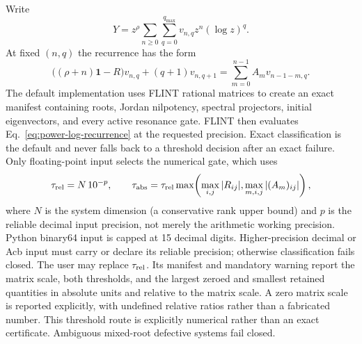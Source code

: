 \documentclass[11pt]{article}
\newcommand{\Id}{\mathbf 1}
\begin{document}
Write
\begin{equation}
  Y=z^\rho\sum_{n\geq0}\sum_{q=0}^{q_{\max}}
  v_{n,q}z^n(\log z)^q.
\end{equation}
At fixed $(n,q)$ the recurrence has the form
\begin{equation}
  \bigl((\rho+n)\Id-R\bigr)v_{n,q}
  +(q+1)v_{n,q+1}
  =\sum_{m=0}^{n-1}A_m v_{n-1-m,q}.
  \label{eq:power-log-recurrence}
\end{equation}
The default implementation uses FLINT rational matrices to create an exact manifest
containing roots, Jordan nilpotency, spectral projectors, initial eigenvectors, and every
active resonance gate.  FLINT then evaluates Eq.~\eqref{eq:power-log-recurrence} at the
  requested precision.  Exact classification is the default and never falls back to a
  threshold decision after an exact failure.  Only floating-point input selects the
  numerical gate, which uses
\begin{equation}
  \tau_{\rm rel}=N\,10^{-p},
  \qquad
  \tau_{\rm abs}=\tau_{\rm rel}
  \max\!\left(\max_{i,j}|R_{ij}|,\max_{m,i,j}|(A_m)_{ij}|\right),
  \label{eq:numerical-log-threshold}
\end{equation}
where $N$ is the system dimension (a conservative rank upper bound) and $p$ is the reliable
decimal input precision, not merely the arithmetic working precision.  Python binary64
input is capped at 15 decimal digits.  Higher-precision decimal or Acb input must carry or
declare its reliable precision; otherwise classification fails closed.  The user may replace
$\tau_{\rm rel}$.  Its manifest and mandatory warning report the matrix scale, both
thresholds, and the largest zeroed and smallest retained quantities in absolute units and
relative to the matrix scale.  A zero matrix scale is reported explicitly, with undefined
relative ratios rather than a fabricated number.  This threshold route is explicitly
 numerical rather than an exact certificate.  Ambiguous mixed-root defective systems fail
 closed.
\end{document}
